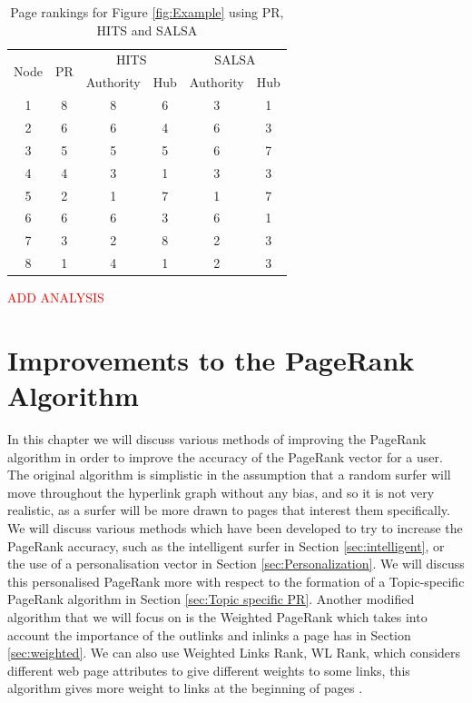 \documentclass[11pt]{report}
\begin{document}
{\begin{table}[H] \caption{Page rankings for Figure \ref{fig:Example} using PR, HITS and SALSA }
 \centering
 \begin{tabular} {c| c| c| c| c| c} 
 \multirow{2}{*}{Node} & \multirow{2}{*}{PR} & \multicolumn{2}{|c|}{HITS} & \multicolumn{2}{|c}{SALSA} \\ [0.5ex] 
 {}&{}&Authority & Hub & Authority & Hub\\ 
 \hline
 1&8&8&6&3&1\\
 2&6&6&4&6&3\\
 3&5&5&5&6&7\\
 4&4&3&1&3&3\\
 5&2&1&7&1&7\\
 6&6&6&3&6&1\\
 7&3&2&8&2&3\\
 8&1&4&1&2&3\\
 \end{tabular}
 \label{Table: comparison}
\end{table}

 \textcolor{red}{ADD ANALYSIS}
 
\chapter{Improvements to the PageRank Algorithm} \label{chap:Improve}
In this chapter we will discuss various methods of improving the PageRank algorithm in order to improve the accuracy of the PageRank vector for a user. The original algorithm is simplistic in the assumption that a random surfer will move throughout the hyperlink graph without any bias, and so it is not very realistic, as a surfer will be more drawn to pages that interest them specifically. We will discuss various methods which have been developed to try to increase the PageRank accuracy, such as the intelligent surfer in Section \ref{sec:intelligent}, or the use of a personalisation vector in Section \ref{sec:Personalization}. We will discuss this personalised PageRank more with respect to the formation of a Topic-specific PageRank algorithm in Section \ref{sec:Topic specific PR}. Another modified algorithm that we will focus on is the Weighted PageRank which takes into account the importance of the outlinks and inlinks a page has \cite{xing2004weighted} in Section \ref{sec:weighted}. We can also use Weighted Links Rank, WL Rank, which considers different web page attributes to give different weights to some links, this algorithm gives more weight to links at the beginning of pages \cite{baeza2004web}.

}
\end{document}
